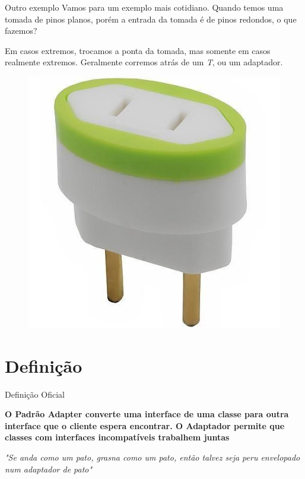 \documentclass{if-beamer}
\begin{document}
\begin{frame}

	\begin{block}{Outro exemplo}
		Vamos para um exemplo mais cotidiano. Quando temos uma tomada de pinos planos, porém a entrada da tomada é de pinos redondos, o que fazemos?

		Em casos extremos, trocamos a ponta da tomada, mas somente em casos realmente extremos. Geralmente corremos atrás de um {\itshape T}, ou um adaptador.

	\end{block}

	\begin{figure}
		\centering
		\includegraphics[scale=0.10]{adaptador.jpg}
	\end{figure}
\end{frame}

\section{Definição}
\begin{frame}{Definição Oficial}
	\begin{block}{}
		\textbf{\textcolor{ofc}{O Padrão Adapter converte uma interface de uma classe para outra interface que o cliente espera encontrar. O Adaptador permite que classes com interfaces incompatíveis trabalhem juntas}}
	\end{block}

	\begin{exampleblock}{}
		{\itshape "Se anda como um pato, grasna como um pato, então talvez seja peru envelopado num adaptador de pato"}
	\end{exampleblock}
\end{frame}
\end{document}
